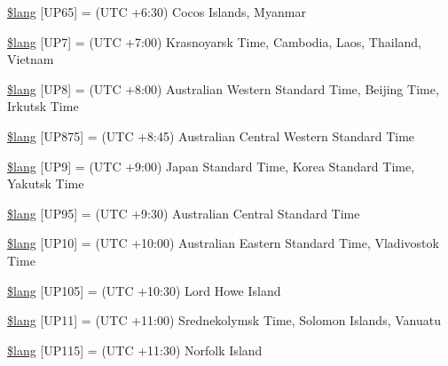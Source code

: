 \begin{DoxyCompactItemize}
\item 
\mbox{\hyperlink{date__lang_8php_a5f4fe559fb8bcc16ee8b5fa61d9f4699}{\$lang}} \mbox{[}\textquotesingle{}U\+P65\textquotesingle{}\mbox{]} = \textquotesingle{}(U\+TC +6\+:30) Cocos Islands, Myanmar\textquotesingle{}
\item 
\mbox{\hyperlink{date__lang_8php_a799732511cb304bbc912cd2931310624}{\$lang}} \mbox{[}\textquotesingle{}U\+P7\textquotesingle{}\mbox{]} = \textquotesingle{}(U\+TC +7\+:00) Krasnoyarsk Time, Cambodia, Laos, Thailand, Vietnam\textquotesingle{}
\item 
\mbox{\hyperlink{date__lang_8php_acf285ccb0e9fe588e2b6ff4b956c00f3}{\$lang}} \mbox{[}\textquotesingle{}U\+P8\textquotesingle{}\mbox{]} = \textquotesingle{}(U\+TC +8\+:00) Australian Western Standard Time, Beijing Time, Irkutsk Time\textquotesingle{}
\item 
\mbox{\hyperlink{date__lang_8php_ad7cd66fa1f2c05bc37e5efe474398fc0}{\$lang}} \mbox{[}\textquotesingle{}U\+P875\textquotesingle{}\mbox{]} = \textquotesingle{}(U\+TC +8\+:45) Australian Central Western Standard Time\textquotesingle{}
\item 
\mbox{\hyperlink{date__lang_8php_a8f4b6ef7f33951463505863c088683bc}{\$lang}} \mbox{[}\textquotesingle{}U\+P9\textquotesingle{}\mbox{]} = \textquotesingle{}(U\+TC +9\+:00) Japan Standard Time, Korea Standard Time, Yakutsk Time\textquotesingle{}
\item 
\mbox{\hyperlink{date__lang_8php_ae2bbb12623aa152f19b174499c3981fc}{\$lang}} \mbox{[}\textquotesingle{}U\+P95\textquotesingle{}\mbox{]} = \textquotesingle{}(U\+TC +9\+:30) Australian Central Standard Time\textquotesingle{}
\item 
\mbox{\hyperlink{date__lang_8php_accbfa4eb6a14112e43380e29687911f1}{\$lang}} \mbox{[}\textquotesingle{}U\+P10\textquotesingle{}\mbox{]} = \textquotesingle{}(U\+TC +10\+:00) Australian Eastern Standard Time, Vladivostok Time\textquotesingle{}
\item 
\mbox{\hyperlink{date__lang_8php_af8992c0f13db4171052e552a6b645dbf}{\$lang}} \mbox{[}\textquotesingle{}U\+P105\textquotesingle{}\mbox{]} = \textquotesingle{}(U\+TC +10\+:30) Lord Howe Island\textquotesingle{}
\item 
\mbox{\hyperlink{date__lang_8php_a41eae482c6d807d62b7b89ba1c926410}{\$lang}} \mbox{[}\textquotesingle{}U\+P11\textquotesingle{}\mbox{]} = \textquotesingle{}(U\+TC +11\+:00) Srednekolymsk Time, Solomon Islands, Vanuatu\textquotesingle{}
\item 
\mbox{\hyperlink{date__lang_8php_a7efc03895acaf0d826fc1067ed3a130a}{\$lang}} \mbox{[}\textquotesingle{}U\+P115\textquotesingle{}\mbox{]} = \textquotesingle{}(U\+TC +11\+:30) Norfolk Island\textquotesingle{}

\end{DoxyCompactItemize}
